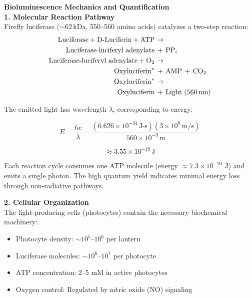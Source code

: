 \begin{technical}
{\Large\textbf{Bioluminescence Mechanics and Quantification}}\\[0.7em]

\noindent\textbf{1. Molecular Reaction Pathway}\\
Firefly luciferase ($\sim 62\,\text{kDa}$, 550–560 amino acids) catalyzes a two-step reaction:
\begin{align*}
\text{Luciferase} + \text{D-Luciferin} + \text{ATP} 
&\rightarrow {} \\
\text{Luciferase-luciferyl adenylate} &\,+\, \text{PP}_i \\
\text{Luciferase-luciferyl adenylate} + \text{O}_2 
&\rightarrow {} \\
\text{Oxyluciferin}^* &\,+\, \text{AMP} \,+\, \text{CO}_2 \\
\text{Oxyluciferin}^* 
&\rightarrow {} \\
\text{Oxyluciferin} &\,+\, \text{Light (560\,nm)}
\end{align*}

The emitted light has wavelength $\lambda$, corresponding to energy:

\begin{equation}
E = \frac{hc}{\lambda} = 
\frac{(6.626 \times 10^{-34}\,\text{J·s}) (3 \times 10^8\,\text{m/s})}
{560 \times 10^{-9}\,\text{m}} 
\end{equation}

\begin{equation}
\approx 3.55 \times 10^{-19}\,\text{J}
\end{equation}

Each reaction cycle consumes one ATP molecule (energy $\approx 7.3 \times 10^{-20}$ J) and emits a single photon. The high quantum yield indicates minimal energy loss through non-radiative pathways.

\noindent\textbf{2. Cellular Organization}\\
The light-producing cells (photocytes) contain the necessary biochemical machinery:

\begin{itemize}
    \item Photocyte density: $\sim 10^5$–$10^6$ per lantern
    \item Luciferase molecules: $\sim 10^6$–$10^7$ per photocyte
    \item ATP concentration: 2–5 mM in active photocytes
    \item Oxygen control: Regulated by nitric oxide (NO) signaling
\end{itemize}


\end{technical}

